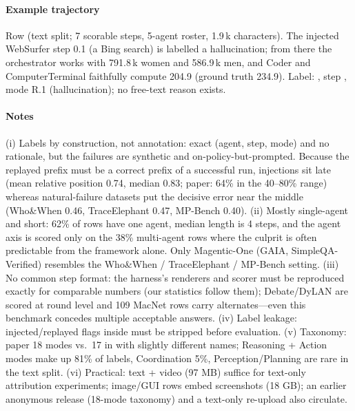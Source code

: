\paragraph{Example trajectory} Row  (text split; 7 scorable steps, 5-agent roster, 1.9\,k characters). The injected WebSurfer step 0.1 (a Bing search) is labelled a hallucination; from there the orchestrator works with 791.8\,k women and 586.9\,k men, and Coder and ComputerTerminal faithfully compute 204.9 (ground truth 234.9). Label: , step , mode R.1 (hallucination); no free-text reason exists.


\paragraph{Notes} (i) Labels by construction, not annotation: exact (agent, step, mode) and no rationale, but the failures are synthetic and on-policy-but-prompted. Because the replayed prefix must be a correct prefix of a successful run, injections sit late (mean relative position 0.74, median 0.83; paper: 64\% in the 40--80\% range) whereas natural-failure datasets put the decisive error near the middle (Who\&When 0.46, TraceElephant 0.47, MP-Bench 0.40). (ii) Mostly single-agent and short: 62\% of rows have one agent, median length is 4 steps, and the agent axis is scored only on the 38\% multi-agent rows where the culprit is often predictable from the framework alone. Only Magentic-One (GAIA, SimpleQA-Verified) resembles the Who\&When / TraceElephant / MP-Bench setting. (iii) No common step format: the harness's renderers and scorer must be reproduced exactly for comparable numbers (our statistics follow them); Debate/DyLAN are scored at round level and 109 MacNet rows carry  alternates---even this benchmark concedes multiple acceptable answers. (iv) Label leakage: injected/replayed flags inside  must be stripped before evaluation. (v) Taxonomy: paper 18 modes vs.\ 17 in  with slightly different names; Reasoning + Action modes make up 81\% of labels, Coordination 5\%, Perception/Planning are rare in the text split. (vi) Practical: text + video (97 MB) suffice for text-only attribution experiments; image/GUI rows embed screenshots (18 GB); an earlier anonymous release  (18-mode taxonomy) and a text-only re-upload also circulate.

